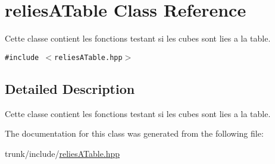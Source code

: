 \hypertarget{classreliesATable}{
\section{reliesATable Class Reference}
\label{classreliesATable}
}
Cette classe contient les fonctions testant si les cubes sont lies a la table.  


{\tt \#include $<$reliesATable.hpp$>$}



\subsection{Detailed Description}
Cette classe contient les fonctions testant si les cubes sont lies a la table. 

The documentation for this class was generated from the following file:\begin{CompactItemize}
\item 
trunk/include/\hyperlink{reliesATable_8hpp}{reliesATable.hpp}\end{CompactItemize}
